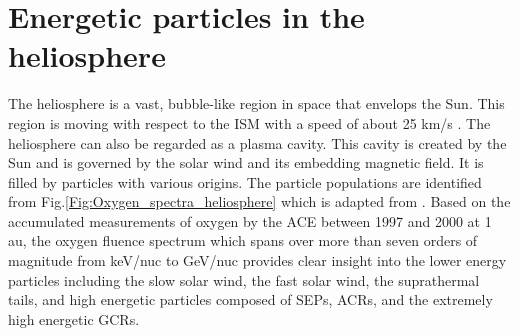 \section{Energetic particles in the heliosphere}
\label{sec:particles_heliosphere}


The heliosphere is a vast, bubble-like region in space that envelops the Sun. This region is moving with respect to the \ac{ISM} with a speed of about 25 km/s \citep{McComas2015ApJS}. The heliosphere can also be regarded as a plasma cavity. This cavity is created by the Sun and is governed by the solar wind and its embedding magnetic field. It is filled by particles with various origins. The particle populations are identified from Fig.\ref{Fig:Oxygen_spectra_heliosphere} which is adapted from \citet{Mewaldt-2001}. Based on the accumulated measurements of oxygen by the \ac{ACE} between 1997 and 2000 at 1 au, the oxygen fluence spectrum which spans over more than seven orders of magnitude from keV/nuc to GeV/nuc provides clear insight into the lower energy particles including the slow solar wind, the fast solar wind, the suprathermal tails, and high energetic particles composed of \acp{SEP}, \acp{ACR}, and the extremely high energetic \acp{GCR}. 



